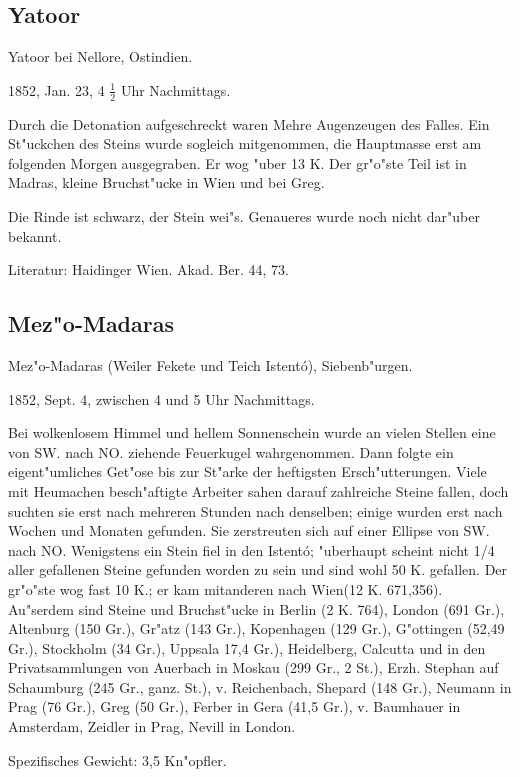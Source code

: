 \documentclass[a4paper, 11pt, oneside]{article}
\begin{document}
\subsection{Yatoor}

Yatoor bei Nellore, Ostindien.

1852, Jan. 23, 4 $\frac{1}{2}$ Uhr Nachmittags.

Durch die Detonation aufgeschreckt waren Mehre Augenzeugen des Falles. Ein St"uckchen des Steins wurde sogleich mitgenommen, die Hauptmasse erst am folgenden Morgen ausgegraben. Er wog "uber 13 K. Der gr"o"ste Teil ist in Madras, kleine Bruchst"ucke in Wien und bei Greg.

Die Rinde ist schwarz, der Stein wei"s. Genaueres wurde noch nicht dar"uber bekannt.

Literatur: Haidinger Wien. Akad. Ber. 44, 73.

\subsection{Mez"o-Madaras}

Mez"o-Madaras (Weiler Fekete und Teich Istentó), Siebenb"urgen.

1852, Sept. 4, zwischen 4 und 5 Uhr Nachmittags.

Bei wolkenlosem Himmel und hellem Sonnenschein wurde an vielen Stellen eine von SW. nach NO. ziehende Feuerkugel wahrgenommen. Dann folgte ein eigent"umliches Get"ose bis zur St"arke der heftigsten Ersch"utterungen. Viele mit Heumachen besch"aftigte Arbeiter sahen darauf zahlreiche Steine fallen, doch suchten sie erst nach mehreren Stunden nach denselben; einige wurden erst nach Wochen und Monaten gefunden. Sie zerstreuten sich auf einer Ellipse von SW. nach NO. Wenigstens ein Stein fiel in den Istentó; "uberhaupt scheint nicht 1/4 aller gefallenen Steine gefunden worden zu sein und sind wohl 50 K. gefallen. Der gr"o"ste wog fast 10 K.; er kam mitanderen nach Wien(12 K. 671,356). Au"serdem sind Steine und Bruchst"ucke in Berlin (2 K. 764), London (691 Gr.), Altenburg (150 Gr.), Gr"atz (143 Gr.), Kopenhagen (129 Gr.), G"ottingen (52,49 Gr.), Stockholm (34 Gr.), Uppsala 17,4 Gr.), Heidelberg, Calcutta und in den Privatsammlungen von Auerbach in Moskau (299 Gr., 2 St.), Erzh. Stephan auf Schaumburg (245 Gr., ganz. St.), v. Reichenbach, Shepard (148 Gr.), Neumann in Prag (76 Gr.), Greg (50 Gr.), Ferber in Gera (41,5 Gr.), v. Baumhauer in Amsterdam, Zeidler in Prag, Nevill in London.

Spezifisches Gewicht: 3,5 Kn"opfler.
\end{document}
